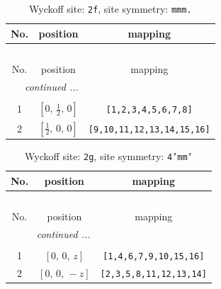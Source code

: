 \documentclass[fleqn,8pt]{jsarticle}
\begin{document}
\renewcommand{\arraystretch}{1.2}
\begin{longtable}{ccc}
\caption{Wyckoff site: {\tt 2f}, site symmetry: {\tt mmm.}}
 \\
 \hline \hline
No. & position & mapping \\ \hline \endfirsthead

\multicolumn{2}{l}{\tablename\ \thetable{}} \\
 \hline \hline
No. & position & mapping \\ \hline \endhead

 \hline \hline
\multicolumn{2}{r}{\footnotesize\it continued ...} \\ \endfoot

 \hline \hline
\multicolumn{2}{r}{} \\ \endlastfoot

1 & $\left[ 0,\, \frac{1}{2},\, 0 \right]$ & {\tt [1,2,3,4,5,6,7,8]} \\ \hline
2 & $\left[ \frac{1}{2},\, 0,\, 0 \right]$ & {\tt [9,10,11,12,13,14,15,16]} \\
\end{longtable}
\renewcommand{\arraystretch}{1.2}
\begin{longtable}{ccc}
\caption{Wyckoff site: {\tt 2g}, site symmetry: {\tt 4'mm'}}
 \\
 \hline \hline
No. & position & mapping \\ \hline \endfirsthead

\multicolumn{2}{l}{\tablename\ \thetable{}} \\
 \hline \hline
No. & position & mapping \\ \hline \endhead

 \hline \hline
\multicolumn{2}{r}{\footnotesize\it continued ...} \\ \endfoot

 \hline \hline
\multicolumn{2}{r}{} \\ \endlastfoot

1 & $\left[ 0,\, 0,\, z \right]$ & {\tt [1,4,6,7,9,10,15,16]} \\ \hline
2 & $\left[ 0,\, 0,\, - z \right]$ & {\tt [2,3,5,8,11,12,13,14]} \\
\end{longtable}
\renewcommand{\arraystretch}{1.2}
\end{document}
